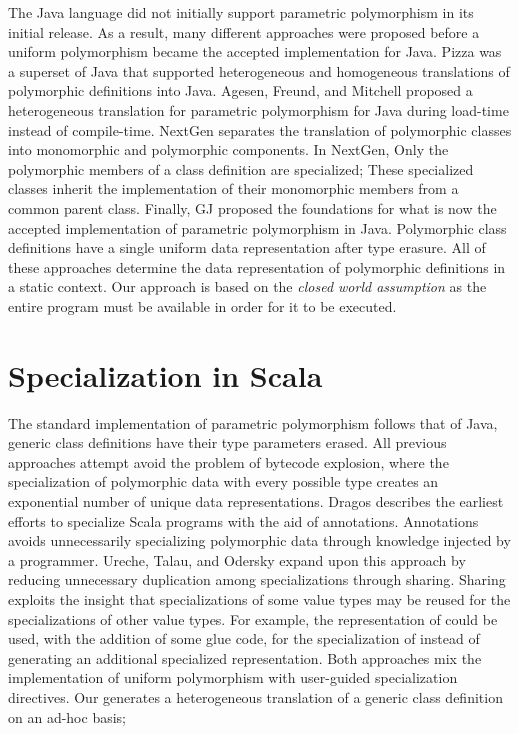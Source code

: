 The Java language did not initially support parametric polymorphism in its initial release.
As a result, many different approaches were proposed before a uniform polymorphism became the accepted implementation for Java.
Pizza\cite{java:pizza} was a superset of Java that supported heterogeneous and homogeneous translations of polymorphic definitions into Java.
Agesen, Freund, and Mitchell proposed a heterogeneous translation for parametric polymorphism for Java during load-time instead of compile-time\cite{java:agesen-type-params}.
NextGen\cite{java:nextgen} separates the translation of polymorphic classes into monomorphic and polymorphic components.
In NextGen, Only the polymorphic members of a class definition are specialized; These specialized classes inherit the implementation of their monomorphic members from a common parent class.
Finally, GJ\cite{java:gj} proposed the foundations for what is now the accepted implementation of parametric polymorphism in Java.
Polymorphic class definitions have a single uniform data representation after type erasure.
All of these approaches determine the data representation of polymorphic definitions in a static context.
Our approach is based on the \textit{closed world assumption} as the entire program must be available in order for it to be executed.

\section{Specialization in Scala}

The standard implementation of parametric polymorphism follows that of Java, generic class definitions have their type parameters erased.
All previous approaches  attempt avoid the problem of bytecode explosion, where the specialization of polymorphic data with every possible type creates an exponential number of unique data representations.
Dragos describes the earliest efforts to specialize Scala programs with the aid of annotations\cite{scala:specialization}.
Annotations avoids unnecessarily specializing polymorphic data through knowledge injected by a programmer.
Ureche, Talau, and Odersky expand upon this approach by reducing unnecessary duplication among specializations through sharing\cite{scala:miniboxing}.
Sharing exploits the insight that specializations of some value types may be reused for the specializations of other value types.
For example, the representation of  could be used, with the addition of some glue code, for the specialization of  instead of generating an additional specialized representation. 
Both approaches mix the implementation of uniform polymorphism with user-guided specialization directives.
Our generates a heterogeneous translation of a generic class definition on an ad-hoc basis;

